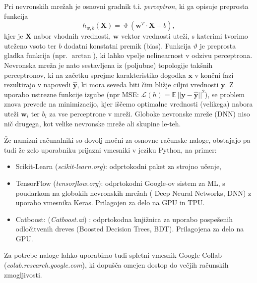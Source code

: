 \documentclass[slovene,11pt,a4paper]{article}
\def\theta{\vartheta}
\begin{document}
Pri nevronskih mrežah je osnovni gradnik t.i. \emph{perceptron}, ki ga opisuje preprosta funkcija
\[h_{w,b}(\mathbf{X})=\operatorname{\theta}\left(\mathbf{w}^{T} \cdot \mathbf{X} + b\right),\]
kjer je $\mathbf{X}$ nabor vhodnih vrednosti, $\mathbf{w}$ vektor vrednosti uteži, s katerimi
tvorimo uteženo vsoto ter $b$ dodatni konstatni premik (bias). Funkcija $\theta$ je preprosta
gladka funkcija (npr. $\arctan$), ki lahko vpelje nelinearnost v odzivu perceptrona. Nevronska
mreža je nato sestavljena iz (poljubne) topologije takšnih perceptronov, ki na začetku
sprejme karakteristiko dogodka $\mathbf{x}$ v končni fazi rezultirajo v napovedi $\mathbf{\hat{y}}$, ki 
mora seveda biti čim bližje ciljni vrednosti $\mathbf{y}$. Z uporabo ustrezne funkcije 
izgube (npr MSE: \(\mathcal{L}(h)=\mathbb{E}\, ||\mathbf{y}-\mathbf{\hat{y}}||^2\)), se problem znova prevede na
minimizacijo, kjer iščemo optimalne vrednosti (velikega) nabora uteži $\mathbf{w}_i$ ter
$b_i$ za vse perceptrone v mreži. Globoke nevronske mreže (DNN) niso nič drugega, kot 
velike nevronske mreže ali skupine le-teh. 

Že namizni računalniki so
dovolj močni za  osnovne računske naloge, obstajajo pa tudi že zelo uporabniku prijazni vmesniki v jeziku Python, na primer:
\begin{itemize}
  \item Scikit-Learn (\emph{scikit-learn.org}): odprtokodni paket za strojno učenje,
  \item TensorFlow (\emph{tensorflow.org}): odprtokodni Google-ov sistem za ML, s poudarkom na globokih nevronskih mrežah 
  ( Deep Neural Networks, DNN) z uporabo vmesnika Keras. Prilagojen za delo na GPU in TPU. 
  \item Catboost: (\emph{Catboost.ai}) : odprtokodna knjižnica za uporabo pospešenih odločitvenih dreves (Boosted Decision Trees, BDT). Prilagojena za delo na GPU.
\end{itemize}
Za potrebe naloge lahko uporabimo tudi spletni vmesnik Google Collab (\emph{colab.research.google.com}), ki dopušča omejen dostop 
do večjih računskih zmogljivosti.
\end{document}
